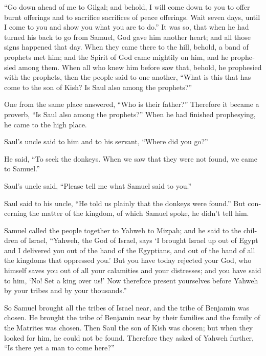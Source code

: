 \begin{paracol}{2}
\begin{otherlanguage}{english}
 ``Go down ahead of me to Gilgal; and behold, I will come
down to you to offer burnt offerings and to sacrifice sacrifices of
peace offerings. Wait seven days, until I come to you and show you what
you are to do.''  It was so, that when he had turned his
back to go from Samuel, God gave him another heart; and all those signs
happened that day.  When they came there to the hill,
behold, a band of prophets met him; and the Spirit of God came mightily
on him, and he prophesied among them.  When all who knew
him before saw that, behold, he prophesied with the prophets, then the
people said to one another, ``What is this that has come to the son of
Kish? Is Saul also among the prophets?''

 One from the same place answered, ``Who is their
father?'' Therefore it became a proverb, ``Is Saul also among the
prophets?''  When he had finished prophesying, he came to
the high place.

 Saul's uncle said to him and to his servant, ``Where did
you go?''

He said, ``To seek the donkeys. When we saw that they were not found, we
came to Samuel.''

 Saul's uncle said, ``Please tell me what Samuel said to
you.''

 Saul said to his uncle, ``He told us plainly that the
donkeys were found.'' But concerning the matter of the kingdom, of which
Samuel spoke, he didn't tell him.

 Samuel called the people together to Yahweh to Mizpah;
 and he said to the children of Israel, ``Yahweh, the God
of Israel, says `I brought Israel up out of Egypt and I delivered you
out of the hand of the Egyptians, and out of the hand of all the
kingdoms that oppressed you.'  But you have today
rejected your God, who himself saves you out of all your calamities and
your distresses; and you have said to him, `No! Set a king over us!' Now
therefore present yourselves before Yahweh by your tribes and by your
thousands.''

 So Samuel brought all the tribes of Israel near, and the
tribe of Benjamin was chosen.  He brought the tribe of
Benjamin near by their families and the family of the Matrites was
chosen. Then Saul the son of Kish was chosen; but when they looked for
him, he could not be found.  Therefore they asked of
Yahweh further, ``Is there yet a man to come here?''


\end{otherlanguage}
\end{paracol}
